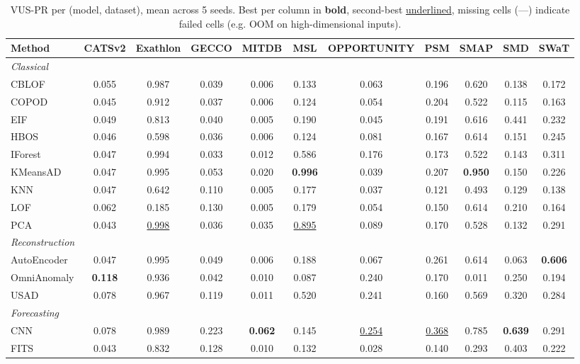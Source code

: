 \begin{table}[t]
\centering
\small
\caption{VUS-PR per (model, dataset), mean across 5 seeds. Best per column in \textbf{bold}, second-best \underline{underlined}, missing cells (---) indicate failed cells (e.g. OOM on high-dimensional inputs).}
\label{tab:by-dataset-vus-pr}
\begin{tabular}{lcccccccccc}
\toprule
Method & CATSv2 & Exathlon & GECCO & MITDB & MSL & OPPORTUNITY & PSM & SMAP & SMD & SWaT \\
\midrule
\multicolumn{11}{l}{\textit{Classical}} \\
CBLOF & 0.055 & 0.987 & 0.039 & 0.006 & 0.133 & 0.063 & 0.196 & 0.620 & 0.138 & 0.172 \\
COPOD & 0.045 & 0.912 & 0.037 & 0.006 & 0.124 & 0.054 & 0.204 & 0.522 & 0.115 & 0.163 \\
EIF & 0.049 & 0.813 & 0.040 & 0.005 & 0.190 & 0.045 & 0.191 & 0.616 & 0.441 & 0.232 \\
HBOS & 0.046 & 0.598 & 0.036 & 0.006 & 0.124 & 0.081 & 0.167 & 0.614 & 0.151 & 0.245 \\
IForest & 0.047 & 0.994 & 0.033 & 0.012 & 0.586 & 0.176 & 0.173 & 0.522 & 0.143 & 0.311 \\
KMeansAD & 0.047 & 0.995 & 0.053 & 0.020 & \textbf{0.996} & 0.039 & 0.207 & \textbf{0.950} & 0.150 & 0.226 \\
KNN & 0.047 & 0.642 & 0.110 & 0.005 & 0.177 & 0.037 & 0.121 & 0.493 & 0.129 & 0.138 \\
LOF & 0.062 & 0.185 & 0.130 & 0.005 & 0.179 & 0.054 & 0.150 & 0.614 & 0.210 & 0.164 \\
PCA & 0.043 & \underline{0.998} & 0.036 & 0.035 & \underline{0.895} & 0.089 & 0.170 & 0.528 & 0.132 & 0.291 \\
\midrule
\multicolumn{11}{l}{\textit{Reconstruction}} \\
AutoEncoder & 0.047 & 0.995 & 0.049 & 0.006 & 0.188 & 0.067 & 0.261 & 0.614 & 0.063 & \textbf{0.606} \\
OmniAnomaly & \textbf{0.118} & 0.936 & 0.042 & 0.010 & 0.087 & 0.240 & 0.170 & 0.011 & 0.250 & 0.194 \\
USAD & 0.078 & 0.967 & 0.119 & 0.011 & 0.520 & 0.241 & 0.160 & 0.569 & 0.320 & 0.284 \\
\midrule
\multicolumn{11}{l}{\textit{Forecasting}} \\
CNN & 0.078 & 0.989 & 0.223 & \textbf{0.062} & 0.145 & \underline{0.254} & \underline{0.368} & 0.785 & \textbf{0.639} & 0.291 \\
FITS & 0.043 & 0.832 & 0.128 & 0.010 & 0.132 & 0.028 & 0.140 & 0.293 & 0.403 & 0.222 \\

\end{tabular}
\end{table}
